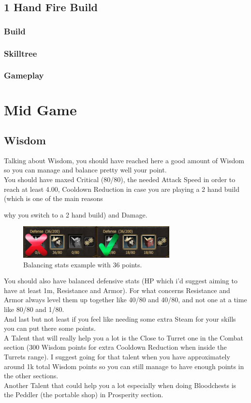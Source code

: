 \documentclass[12pt]{article}
\begin{document}

\subsection{1 Hand Fire Build}
\subsubsection{Build}
\subsubsection{Skilltree}
\subsubsection{Gameplay}

\newpage


\section{Mid Game}

\subsection{Wisdom}
\justifying
Talking about Wisdom, you should have reached here a good amount of Wisdom so you can manage and balance pretty well your point. \\
You should have maxed Critical (80/80), the needed Attack Speed in order to reach at least 4.00, Cooldown Reduction in case you are playing a 2 hand build (which is one of the main reasons \raggedright why you switch to a 2 hand build) and Damage.
\begin{figure}
    \includegraphics[width=8cm]{wisdom/wisdom_example.png}
    \caption{Balancing stats example with 36 points.}
    \centering
\end{figure}
\justifying
You should also have balanced defensive stats (HP which i'd suggest aiming to have at least 1m, Resistance and Armor). For what concerns Resistance and Armor always level them up together like 40/80 and 40/80, and not one at a time like 80/80 and 1/80. \\
And last but not least if you feel like needing some extra Steam for your skills you can put there some points. \\
A Talent that will really help you a lot is the Close to Turret one in the Combat section (300 Wisdom points for extra Cooldown Reduction when inside the Turrets range). I suggest going for that talent when you have approximately around 1k total Wisdom points so you can still manage to have enough points in the other sections. \\
Another Talent that could help you a lot especially when doing Bloodchests is the Peddler (the portable shop) in Prosperity section.
\end{document}
